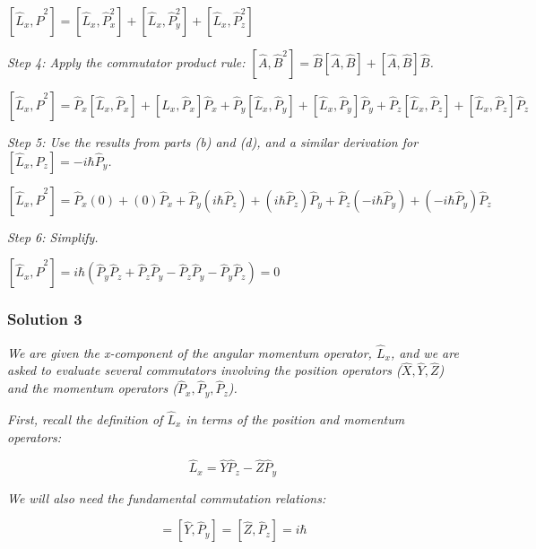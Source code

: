 \documentclass{article}
\begin{document}
$\left[\hat{L}_x, \hat{P}^2\right] = \left[\hat{L}_x, \hat{P}_x^2\right] + \left[\hat{L}_x, \hat{P}_y^2\right] + \left[\hat{L}_x, \hat{P}_z^2\right]$

\textit{Step 4: Apply the commutator product rule: $\left[\hat{A}, \hat{B}^2\right] = \hat{B}\left[\hat{A}, \hat{B}\right] + \left[\hat{A}, \hat{B}\right]\hat{B}$.}

$\left[\hat{L}_x, \hat{P}^2\right] = \hat{P}_x\left[\hat{L}_x, \hat{P}_x\right] + \left[\hat{L}_x, \hat{P}_x\right]\hat{P}_x + \hat{P}_y\left[\hat{L}_x, \hat{P}_y\right] + \left[\hat{L}_x, \hat{P}_y\right]\hat{P}_y + \hat{P}_z\left[\hat{L}_x, \hat{P}_z\right] + \left[\hat{L}_x, \hat{P}_z\right]\hat{P}_z$

\textit{Step 5: Use the results from parts (b) and (d), and a similar derivation for $\left[\hat{L}_x, \hat{P}_z\right] = -i\hbar \hat{P}_y$.}

$\left[\hat{L}_x, \hat{P}^2\right] = \hat{P}_x(0) + (0)\hat{P}_x + \hat{P}_y(i\hbar\hat{P}_z) + (i\hbar\hat{P}_z)\hat{P}_y + \hat{P}_z(-i\hbar\hat{P}_y) + (-i\hbar\hat{P}_y)\hat{P}_z$

\textit{Step 6: Simplify.}

$\left[\hat{L}_x, \hat{P}^2\right] = i\hbar(\hat{P}_y\hat{P}_z + \hat{P}_z\hat{P}_y - \hat{P}_z\hat{P}_y - \hat{P}_y\hat{P}_z) = 0$


\subsubsection{Solution 3}

\textit{We are given the x-component of the angular momentum operator, $\hat{L}_x$, and we are asked to evaluate several commutators involving the position operators ($\hat{X}, \hat{Y}, \hat{Z}$) and the momentum operators ($\hat{P}_x, \hat{P}_y, \hat{P}_z$).}

\textit{First, recall the definition of $\hat{L}_x$ in terms of the position and momentum operators:}

\begin{equation}
\hat{L}_x = \hat{Y}\hat{P}_z - \hat{Z}\hat{P}_y
\end{equation}

\textit{We will also need the fundamental commutation relations:}

\begin{equation}
[\hat{X}, \hat{P}_x] = [\hat{Y}, \hat{P}_y] = [\hat{Z}, \hat{P}_z] = i\hbar
\end{equation}
\end{document}
